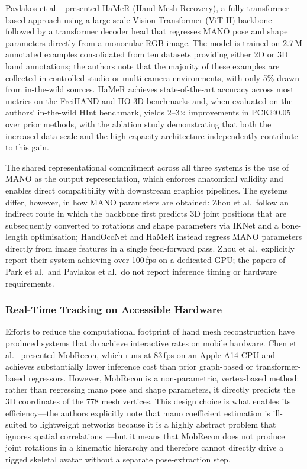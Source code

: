 Pavlakos et al.\ \cite{pavlakos2024hamer} presented HaMeR (Hand Mesh Recovery),
a fully transformer-based approach using a large-scale Vision Transformer (ViT-H)
backbone followed by a transformer decoder head that regresses MANO pose and
shape parameters directly from a monocular RGB image.
The model is trained on 2.7\,M annotated examples consolidated from ten
datasets providing either 2D or 3D hand annotations; the authors note that the
majority of these examples are collected in controlled studio or multi-camera
environments, with only 5\% drawn from in-the-wild sources.
HaMeR achieves state-of-the-art accuracy across most metrics on the FreiHAND and
HO-3D benchmarks and, when evaluated on the authors' in-the-wild HInt benchmark,
yields 2--3$\times$ improvements in PCK@0.05 over prior methods, with the ablation
study demonstrating that both the increased data scale and the high-capacity
architecture independently contribute to this gain.

The shared representational commitment across all three systems is the use of MANO
as the output representation, which enforces anatomical validity and enables direct
compatibility with downstream graphics pipelines.
The systems differ, however, in how MANO parameters are obtained: Zhou et al.\
follow an indirect route in which the backbone first predicts 3D joint positions
that are subsequently converted to rotations and shape parameters via IKNet and a
bone-length optimisation; HandOccNet and HaMeR instead regress MANO parameters
directly from image features in a single feed-forward pass.
Zhou et al.\ explicitly report their system achieving over 100\,fps on a dedicated
GPU; the papers of Park et al.\ and Pavlakos et al.\ do not report inference
timing or hardware requirements.



\subsubsection{Real-Time Tracking on Accessible Hardware}\label{subsubsec:sota_hardware}

Efforts to reduce the computational footprint of hand mesh reconstruction have
produced systems that do achieve interactive rates on mobile hardware.
Chen et al.\ \cite{chen2022mobrecon} presented MobRecon, which runs at 83\,fps
on an Apple A14 CPU and achieves substantially lower inference cost than prior
graph-based or transformer-based regressors.
However, MobRecon is a non-parametric, vertex-based method: rather than
regressing \acrshort{mano} pose and shape parameters, it directly predicts the
3D coordinates of the 778 mesh vertices.
This design choice is what enables its efficiency---the authors explicitly note
that \acrshort{mano} coefficient estimation is ill-suited to lightweight networks
because it is a highly abstract problem that ignores spatial
correlations~\cite{chen2022mobrecon}---but it means that MobRecon does not
produce joint rotations in a kinematic hierarchy and therefore cannot directly
drive a rigged skeletal avatar without a separate pose-extraction step.

